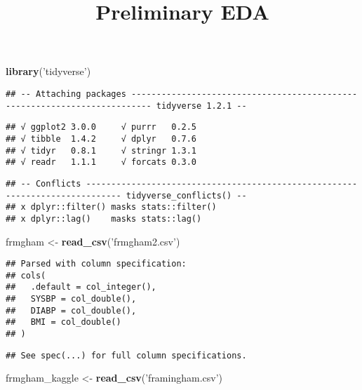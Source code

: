 \documentclass[]{article}
\title{Preliminary EDA}
\author{}
\date{}
\newenvironment{Shaded}{\begin{snugshade}}{\end{snugshade}}
\newcommand{\KeywordTok}[1]{\textcolor[rgb]{0.13,0.29,0.53}{\textbf{#1}}}
\newcommand{\StringTok}[1]{\textcolor[rgb]{0.31,0.60,0.02}{#1}}
\newcommand{\NormalTok}[1]{#1}
\begin{document}
\maketitle

\begin{Shaded}
\begin{Highlighting}[]
\KeywordTok{library}\NormalTok{(}\StringTok{'tidyverse'}\NormalTok{)}
\end{Highlighting}
\end{Shaded}

\begin{verbatim}
## -- Attaching packages -------------------------------------------------------------------------- tidyverse 1.2.1 --
\end{verbatim}

\begin{verbatim}
## √ ggplot2 3.0.0     √ purrr   0.2.5
## √ tibble  1.4.2     √ dplyr   0.7.6
## √ tidyr   0.8.1     √ stringr 1.3.1
## √ readr   1.1.1     √ forcats 0.3.0
\end{verbatim}

\begin{verbatim}
## -- Conflicts ----------------------------------------------------------------------------- tidyverse_conflicts() --
## x dplyr::filter() masks stats::filter()
## x dplyr::lag()    masks stats::lag()
\end{verbatim}

\begin{Shaded}
\begin{Highlighting}[]
\NormalTok{frmgham <-}\StringTok{ }\KeywordTok{read_csv}\NormalTok{(}\StringTok{'frmgham2.csv'}\NormalTok{)}
\end{Highlighting}
\end{Shaded}

\begin{verbatim}
## Parsed with column specification:
## cols(
##   .default = col_integer(),
##   SYSBP = col_double(),
##   DIABP = col_double(),
##   BMI = col_double()
## )
\end{verbatim}

\begin{verbatim}
## See spec(...) for full column specifications.
\end{verbatim}

\begin{Shaded}
\begin{Highlighting}[]
\NormalTok{frmgham_kaggle <-}\StringTok{ }\KeywordTok{read_csv}\NormalTok{(}\StringTok{'framingham.csv'}\NormalTok{)}
\end{Highlighting}
\end{Shaded}
\end{document}
